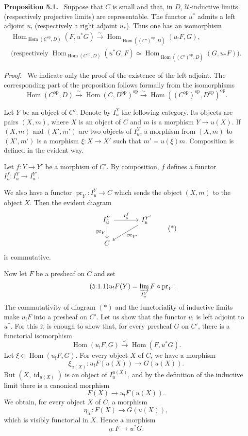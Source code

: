 \documentclass[11pt]{article}
\newcommand{\U}{\mathcal{U}}
\newcommand{\Hom}{\operatorname{Hom}}
\newcommand{\id}{\operatorname{id}}
\newcommand{\op}{\mathrm{op}}
\newcommand{\pr}{\operatorname{pr}}
\newcommand{\Hhom}{\operatorname{Hom}}
\newenvironment{statement}[1]{\par\medskip\noindent\textbf{#1.}\ }{\par\medskip}
\newenvironment{proofsketch}{\par\noindent\emph{Proof.}\ }{\par\medskip}
\begin{document}
\begin{statement}{Proposition 5.1}
Suppose that $C$ is small and that, in $D$, $\U$-inductive limits (respectively projective limits) are representable. The functor $u^*$ admits a left adjoint $u_!$ (respectively a right adjoint $u_* $). Thus one has an isomorphism
\begin{gather*}
\Hom_{\Hhom(C^{\op},D)}(F,u^*G)\xrightarrow{\sim}\Hom_{\Hhom((C')^{\op},D)}(u_!F,G),\\
\bigl(\text{respectively }\Hom_{\Hhom(C^{\op},D)}(u^*G,F)\simeq \Hom_{\Hhom((C')^{\op},D)}(G,u_*F)\bigr).
\end{gather*}
\end{statement}

\begin{proofsketch}
We indicate only the proof of the existence of the left adjoint. The corresponding part of the proposition follows formally from the isomorphisms
\[
\Hhom(C^{\op},D)\xrightarrow{\sim}\Hhom(C,D^{\op})^{\op}\xrightarrow{\sim}\Hhom((C^{\op})^{\op},D^{\op})^{\op}.
\]
\end{proofsketch}

Let $Y$ be an object of $C'$. Denote by $I_u^Y$ the following category. Its objects are pairs $(X,m)$, where $X$ is an object of $C$ and $m$ is a morphism $Y\to u(X)$. If $(X,m)$ and $(X',m')$ are two objects of $I_u^Y$, a morphism from $(X,m)$ to $(X',m')$ is a morphism $\xi:X\to X'$ such that $m'=u(\xi)m$. Composition is defined in the evident way.

Let $f:Y\to Y'$ be a morphism of $C'$. By composition, $f$ defines a functor $I_u^f:I_u^Y\to I_u^{Y'}$.

We also have a functor $\pr_Y:I_u^Y\to C$ which sends the object $(X,m)$ to the object $X$. Then the evident diagram
\[
\begin{tikzcd}[column sep=large]
& I_u^Y\arrow[r,"I_u^f"]\arrow[d,"\pr_Y"']& I_u^{Y'}\arrow[dl,"\pr_{Y'}"]\\
& C &
\end{tikzcd}
\tag{*}
\]
is commutative.

Now let $F$ be a presheaf on $C$ and set
\[
\tag{5.1.1}
u_!F(Y)=\varinjlim_{I_u^Y}F\circ \pr_Y.
\]
The commutativity of diagram $(*)$ and the functoriality of inductive limits make $u_!F$ into a presheaf on $C'$. Let us show that the functor $u_!$ is left adjoint to $u^*$. For this it is enough to show that, for every presheaf $G$ on $C'$, there is a functorial isomorphism
\[
\Hom(u_!F,G)\xrightarrow{\sim}\Hom(F,u^*G).
\]
Let $\xi\in\Hom(u_!F,G)$. For every object $X$ of $C$, we have a morphism
\[
\xi_{u(X)}:u_!F(u(X))\longrightarrow G(u(X)).
\]
But $(X,\id_{u(X)})$ is an object of $I_u^{u(X)}$, and by the definition of the inductive limit there is a canonical morphism
\[
F(X)\longrightarrow u_!F(u(X)).
\]
We obtain, for every object $X$ of $C$, a morphism
\[
\eta_X:F(X)\longrightarrow G(u(X)),
\]
which is visibly functorial in $X$. Hence a morphism
\[
\eta:F\longrightarrow u^*G.
\]
\end{document}
